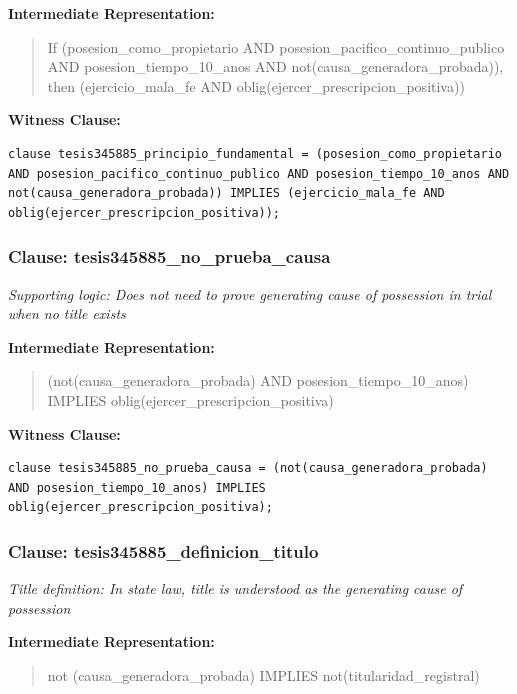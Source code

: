 \documentclass[11pt,a4paper]{article}
\begin{document}
\textbf{Intermediate Representation:}

\begin{quote}
If (posesion\_como\_propietario AND posesion\_pacifico\_continuo\_publico AND posesion\_tiempo\_10\_anos AND not(causa\_generadora\_probada)), then (ejercicio\_mala\_fe AND oblig(ejercer\_prescripcion\_positiva))
\end{quote}

\textbf{Witness Clause:}

\begin{lstlisting}[style=witnessstyle, language=Witness]
clause tesis345885_principio_fundamental = (posesion_como_propietario AND posesion_pacifico_continuo_publico AND posesion_tiempo_10_anos AND not(causa_generadora_probada)) IMPLIES (ejercicio_mala_fe AND oblig(ejercer_prescripcion_positiva));
\end{lstlisting}

\subsubsection{Clause: tesis345885\_no\_prueba\_causa}

\textit{Supporting logic: Does not need to prove generating cause of possession in trial when no title exists}

\textbf{Intermediate Representation:}

\begin{quote}
(not(causa\_generadora\_probada) AND posesion\_tiempo\_10\_anos) IMPLIES oblig(ejercer\_prescripcion\_positiva)
\end{quote}

\textbf{Witness Clause:}

\begin{lstlisting}[style=witnessstyle, language=Witness]
clause tesis345885_no_prueba_causa = (not(causa_generadora_probada) AND posesion_tiempo_10_anos) IMPLIES oblig(ejercer_prescripcion_positiva);
\end{lstlisting}

\subsubsection{Clause: tesis345885\_definicion\_titulo}

\textit{Title definition: In state law, title is understood as the generating cause of possession}

\textbf{Intermediate Representation:}

\begin{quote}
not (causa\_generadora\_probada) IMPLIES not(titularidad\_registral)
\end{quote}
\end{document}
